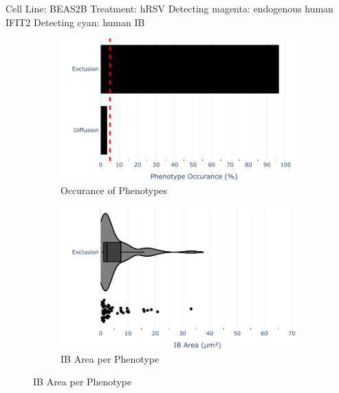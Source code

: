 Cell Line: BEAS2B \newline
Treatment: hRSV \newline
Detecting magenta: endogenous human IFIT2  \newline
Detecting cyan: human IB \newline

\begin{figure}
    \begin{subfigure}{0.5\textwidth}
        \includegraphics[width=1\linewidth]{10. Chapter 5/Figs/01. Infection/02. IFIT2B/01. bar_i2b_a549-n.pdf} 
        \caption[]{Occurance of Phenotypes}
    \end{subfigure}
    \begin{subfigure}{0.5\textwidth}
        \includegraphics[width=1\linewidth]{10. Chapter 5/Figs/01. Infection/02. IFIT2B/02. violin_i2b_a549-n.pdf}
        \caption[]{IB Area per Phenotype}
    \end{subfigure}


\end{figure}
